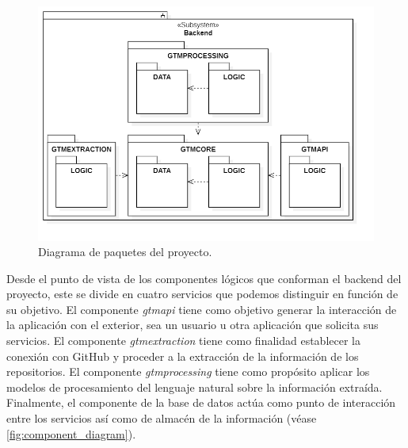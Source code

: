 \begin{figure}[!ht]
	\centering
\includegraphics[width=\textwidth]{img/package_diagram.png}
	\caption{Diagrama de paquetes del proyecto.}
	\label{fig:package_diagram}
\end{figure}

Desde el punto de vista de los componentes lógicos que conforman el backend del proyecto, este se divide en cuatro servicios que podemos distinguir en función de su objetivo. El componente \textit{gtmapi} tiene como objetivo generar la interacción de la aplicación con el exterior, sea un usuario u otra aplicación que solicita sus servicios. El componente \textit{gtmextraction} tiene como finalidad establecer la conexión con GitHub y proceder a la extracción de la información de los repositorios. El componente \textit{gtmprocessing} tiene como propósito aplicar los modelos de procesamiento del lenguaje natural sobre la información extraída. Finalmente, el componente de la base de datos actúa como punto de interacción entre los servicios así como de almacén de la información (véase \autoref{fig:component_diagram}).

